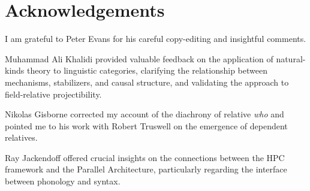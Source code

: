 \chapter*{Acknowledgements}


I am grateful to Peter Evans for his careful copy-editing and insightful comments.

Muhammad Ali Khalidi provided valuable feedback on the application of natural-kinds theory to linguistic categories, clarifying the relationship between mechanisms, stabilizers, and causal structure, and validating the approach to field-relative projectibility.

Nikolas Gisborne corrected my account of the diachrony of relative \textit{who} and pointed me to his work with Robert Truswell on the emergence of dependent relatives.

Ray Jackendoff offered crucial insights on the connections between the HPC framework and the Parallel Architecture, particularly regarding the interface between phonology and syntax.

